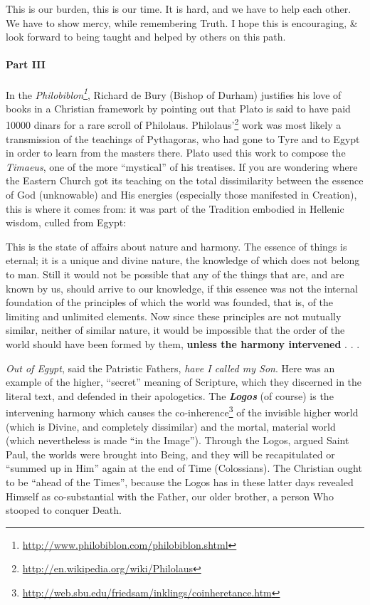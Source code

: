 This is our burden, this is our time. It is hard, and we have to help each other. We have to show mercy, while remembering Truth. I hope this is encouraging, \& look forward to being taught and helped by others on this path.

\paragraph{Part III} In the \emph{Philobiblon\footnote{\url{http://www.philobiblon.com/philobiblon.shtml}}}, Richard de Bury (Bishop of Durham) justifies his love of books in a Christian framework by pointing out that Plato is said to have paid 10000 dinars for a rare scroll of Philolaus. Philolaus'\footnote{\url{http://en.wikipedia.org/wiki/Philolaus}} work was most likely a transmission of the teachings of Pythagoras, who had gone to Tyre and to Egypt in order to learn from the masters there. Plato used this work to compose the \emph{Timaeus}, one of the more ``mystical'' of his treatises. If you are wondering where the Eastern Church got its teaching on the total dissimilarity between the essence of God (unknowable) and His energies (especially those manifested in Creation), this is where it comes from: it was part of the Tradition embodied in Hellenic wisdom, culled from Egypt:

\begin{quotex}
This is the state of affairs about nature and harmony. The essence of things is eternal; it is a unique and divine nature, the knowledge of which does not belong to man. Still it would not be possible that any of the things that are, and are known by us, should arrive to our knowledge, if this essence was not the internal foundation of the principles of which the world was founded, that is, of the limiting and unlimited elements. Now since these principles are not mutually similar, neither of similar nature, it would be impossible that the order of the world should have been formed by them, \textbf{unless the harmony intervened} . . .
\end{quotex}

\emph{Out of Egypt}, said the Patristic Fathers, \emph{have I called my Son}. Here was an example of the higher, ``secret'' meaning of Scripture, which they discerned in the literal text, and defended in their apologetics. The \textbf{\emph{Logos}} (of course) is the intervening harmony which causes the co-inherence\footnote{\url{http://web.sbu.edu/friedsam/inklings/coinheretance.htm}} of the invisible higher world (which is Divine, and completely dissimilar) and the mortal, material world (which nevertheless is made ``in the Image''). Through the Logos, argued Saint Paul, the worlds were brought into Being, and they will be recapitulated or ``summed up in Him'' again at the end of Time (Colossians). The Christian ought to be ``ahead of the Times'', because the Logos has in these latter days revealed Himself as co-substantial with the Father, our older brother, a person Who stooped to conquer Death.

